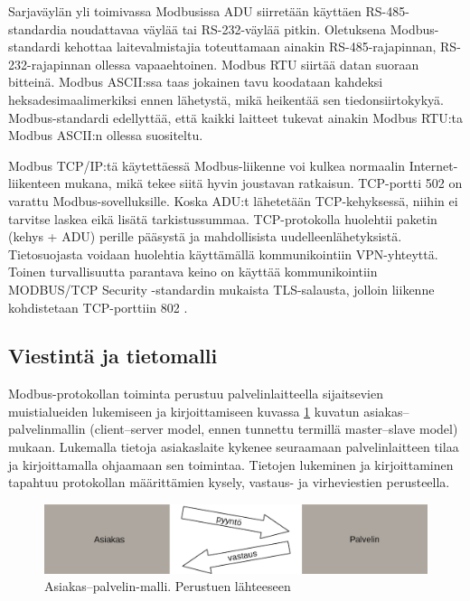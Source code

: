     Sarjaväylän yli toimivassa Modbusissa ADU siirretään käyttäen RS-485-standardia noudattavaa väylää tai RS-232-väylää pitkin. Oletuksena Modbus-standardi kehottaa laitevalmistajia toteuttamaan ainakin RS-485-rajapinnan, RS-232-rajapinnan ollessa vapaaehtoinen. Modbus \gls{RTU} siirtää datan suoraan bitteinä. Modbus \gls{ASCII}:ssa taas jokainen tavu koodataan kahdeksi heksadesimaalimerkiksi ennen lähetystä, mikä heikentää sen tiedonsiirtokykyä. Modbus-standardi edellyttää, että kaikki laitteet tukevat ainakin Modbus RTU:ta Modbus ASCII:n ollessa suositeltu. \parencite{modbusSerialSpec}

    Modbus TCP/IP:tä käytettäessä Modbus-liikenne voi kulkea normaalin Internet-liikenteen mukana, mikä tekee siitä hyvin joustavan ratkaisun. TCP-portti 502 on varattu Modbus-sovelluksille. \parencite{modbusTCPIPSpec} Koska ADU:t lähetetään TCP-kehyksessä, niihin ei tarvitse laskea eikä lisätä tarkistussummaa. TCP-protokolla huolehtii paketin (kehys + ADU) perille pääsystä ja mahdollisista uudelleenlähetyksistä. Tietosuojasta voidaan huolehtia käyttämällä kommunikointiin \gls{VPN}-yhteyttä. Toinen turvallisuutta parantava keino on käyttää kommunikointiin MODBUS/TCP Security -standardin mukaista TLS-salausta, jolloin liikenne kohdistetaan TCP-porttiin 802 \parencite{modbusTCPIPTLSSpec}.

  \subsection{Viestintä ja tietomalli}

  Modbus-protokollan toiminta perustuu palvelinlaitteella sijaitsevien muistialueiden lukemiseen ja kirjoittamiseen kuvassa \ref{fig:c_s} kuvatun asiakas--palvelinmallin (client--server model, ennen tunnettu termillä master--slave model) mukaan.  Lukemalla tietoja asiakaslaite kykenee seuraamaan palvelinlaitteen tilaa ja kirjoittamalla ohjaamaan sen toimintaa. Tietojen lukeminen ja kirjoittaminen tapahtuu protokollan määrittämien kysely, vastaus- ja virheviestien perusteella. \parencite{modbusAppSpec}

  \begin{figure}[h]
    \centering
    \includegraphics[width=1\textwidth]{figures/client_server}
    \caption[Asiakas--palvelin-malli]{Asiakas--palvelin-malli.  Perustuen lähteeseen \parencite{modbusAppSpec}}
    \label{fig:c_s}
  \end{figure}

